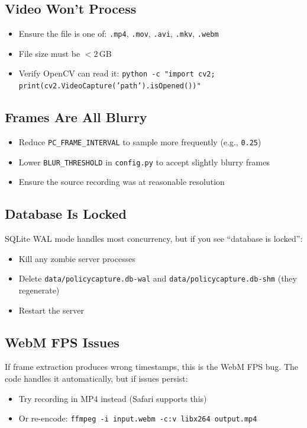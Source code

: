 \documentclass[12pt, a4paper]{article}
\newcommand{\codeinline}[1]{\texttt{\small\colorbox{codebg}{#1}}}
\newcommand{\filepath}[1]{\texttt{\small #1}}
\begin{document}
\subsection{Video Won't Process}

\begin{itemize}
    \item Ensure the file is one of: \codeinline{.mp4}, \codeinline{.mov}, \codeinline{.avi}, \codeinline{.mkv}, \codeinline{.webm}
    \item File size must be $< 2$\,GB
    \item Verify OpenCV can read it: \codeinline{python -c "import cv2; print(cv2.VideoCapture('path').isOpened())"}
\end{itemize}

\subsection{Frames Are All Blurry}

\begin{itemize}
    \item Reduce \codeinline{PC\_FRAME\_INTERVAL} to sample more frequently (e.g., \codeinline{0.25})
    \item Lower \codeinline{BLUR\_THRESHOLD} in \filepath{config.py} to accept slightly blurry frames
    \item Ensure the source recording was at reasonable resolution
\end{itemize}

\subsection{Database Is Locked}

SQLite WAL mode handles most concurrency, but if you see ``database is locked'':
\begin{itemize}
    \item Kill any zombie server processes
    \item Delete \codeinline{data/policycapture.db-wal} and \codeinline{data/policycapture.db-shm} (they regenerate)
    \item Restart the server
\end{itemize}

\subsection{WebM FPS Issues}

If frame extraction produces wrong timestamps, this is the WebM FPS bug. The code handles it automatically, but if issues persist:
\begin{itemize}
    \item Try recording in MP4 instead (Safari supports this)
    \item Or re-encode: \codeinline{ffmpeg -i input.webm -c:v libx264 output.mp4}
\end{itemize}
\end{document}
